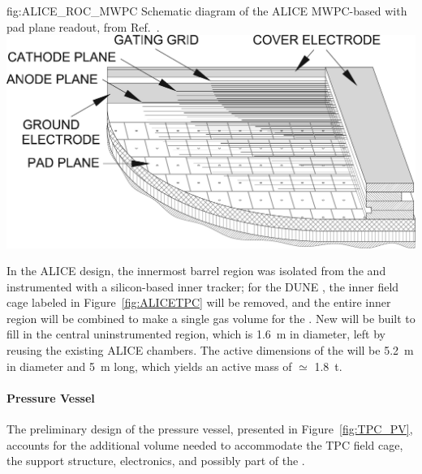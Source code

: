 \begin{dunefigure}{fig:ALICE_ROC_MWPC}
{Schematic diagram of the ALICE MWPC-based  with pad plane readout, from Ref.~\cite{Alme:2010ke}.}
    \includegraphics{graphics/TPC_ROC_MWPC.jpg}
\end{dunefigure}

In the ALICE design, the innermost barrel region was isolated from the  and instrumented with a silicon-based inner tracker; for the DUNE , the inner field cage labeled in Figure~\ref{fig:ALICETPC} will be removed, and the entire inner region will be combined to make a single gas volume for the . New  will be built to fill in the central uninstrumented region, which is \SI{1.6}{m} in diameter, left by reusing the existing ALICE chambers.  The active dimensions of the  will be \SI{5.2}{m} in diameter and \SI{5}{m} long, which yields an active mass of $\simeq$ \SI{1.8}{t}. 


\paragraph{ Pressure Vessel}\label{sec:TPC_PV}

The preliminary design of the pressure vessel, presented in Figure~\ref{fig:TPC_PV}, accounts for the additional volume needed to accommodate the TPC field cage, the  support structure,  electronics, and possibly part of the .

